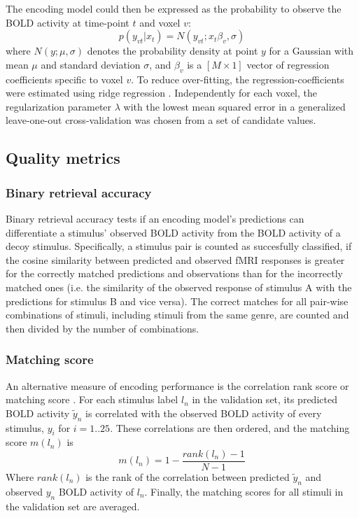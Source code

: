 The encoding model could then be expressed as the probability to observe the
BOLD activity at time-point $t$ and voxel $v$:
%
\begin{equation}
  \label{eq:encmo}
  p(y_{vt}|x_{t}) = N(y_{vt};x_{t}\beta_{v},\sigma)
\end{equation}
%
where $N(y;\mu,\sigma)$ denotes the probability density at point $y$ for a
Gaussian with mean $\mu$ and standard deviation $\sigma$, and $\beta_{v}$ is a
$[M\times1]$ vector of regression coefficients specific to voxel $v$. To reduce
over-fitting, the regression-coefficients were estimated using ridge regression
\citep{HK70}.  Independently for each voxel, the regularization parameter
$\lambda$ with the lowest mean squared error in a generalized leave-one-out
cross-validation \citep{GHW79} was chosen from a set of candidate values.

\subsection*{Quality metrics} 

\subsubsection*{Binary retrieval accuracy}

Binary retrieval accuracy \citep{ML08} tests if an encoding model's predictions
can differentiate a stimulus' observed BOLD activity from the BOLD activity of
a decoy stimulus.  Specifically, a stimulus pair is counted as succesfully
classified, if the cosine similarity between predicted and observed f{MRI}
responses is greater for the correctly matched predictions and observations
than for the incorrectly matched ones (i.e. the similarity of the observed
response of stimulus A with the predictions for stimulus B and vice versa).
The correct matches for all pair-wise combinations of stimuli, including
stimuli from the same genre, are counted and then divided by the number of
combinations.

\subsubsection*{Matching score}
%
An alternative measure of encoding performance is the correlation rank score or
matching score \citep{SF14}. For each stimulus label $l_{n}$ in the validation
set, its predicted BOLD activity $\widetilde{y}_{n}$ is correlated with the
observed BOLD activity of every stimulus, $y_{i}$ for $i=1..25$. These
correlations are then ordered, and the  matching score $m(l_{n})$ is \[
m(l_{n}) = 1-\frac{rank(l_{n})-1}{N-1} \] Where $rank(l_{n})$ is the rank of
the correlation between predicted $\widetilde{y}_{n}$ and observed $y_{n}$ BOLD
activity of $l_{n}$. Finally, the matching scores for all stimuli in the
validation set are averaged.



